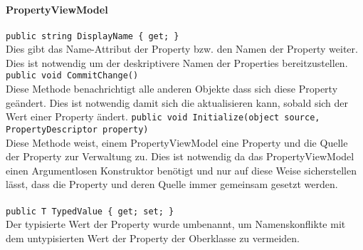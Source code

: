 \subsection{}

\paragraph{\name PropertyViewModel}
\begin{itemize}
	\add \verb!public string DisplayName { get; }! \\
	Dies gibt das Name-Attribut der Property bzw. den Namen der Property weiter. Dies ist notwendig um der  deskriptivere Namen der Properties bereitzustellen.
	\add \verb!public void CommitChange()! \\
	Diese Methode benachrichtigt alle anderen Objekte dass sich diese Property geändert. Dies ist notwendig damit sich die  aktualisieren kann, sobald sich der Wert einer Property ändert.
	\add \verb!public void Initialize(object source, PropertyDescriptor property)! \\
	Diese Methode weist, einem PropertyViewModel eine Property und die Quelle der Property zur Verwaltung zu. Dies ist notwendig da das PropertyViewModel einen Argumentlosen Konstruktor benötigt und nur auf diese Weise sicherstellen lässt, dass die Property und deren Quelle immer gemeinsam gesetzt werden.
\end{itemize}

\paragraph{}
\begin{itemize}
	\change \verb!public T TypedValue { get; set; }! \\
	Der typisierte Wert der Property wurde umbenannt, um Namenskonflikte mit dem untypisierten Wert der Property der Oberklasse zu vermeiden.
\end{itemize}
